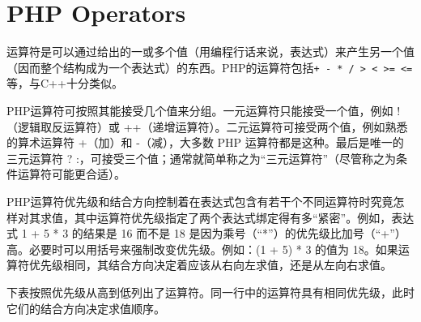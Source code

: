 \chapter{PHP Operators}


运算符是可以通过给出的一或多个值（用编程行话来说，表达式）来产生另一个值（因而整个结构成为一个表达式）的东西。PHP的运算符包括\verb|+ - * / > < >= <=|等，与C++十分类似。

PHP运算符可按照其能接受几个值来分组。一元运算符只能接受一个值，例如 !（逻辑取反运算符）或 +\/+（递增运算符）。二元运算符可接受两个值，例如熟悉的算术运算符 +（加）和 -（减），大多数 PHP 运算符都是这种。最后是唯一的三元运算符 ? :，可接受三个值；通常就简单称之为“三元运算符”（尽管称之为条件运算符可能更合适）。


PHP运算符优先级和结合方向控制着在表达式包含有若干个不同运算符时究竟怎样对其求值，其中运算符优先级指定了两个表达式绑定得有多“紧密”。例如，表达式 1 + 5 * 3 的结果是 16 而不是 18 是因为乘号（“*”）的优先级比加号（“+”）高。必要时可以用括号来强制改变优先级。例如：(1 + 5) * 3 的值为 18。如果运算符优先级相同，其结合方向决定着应该从右向左求值，还是从左向右求值。


下表按照优先级从高到低列出了运算符。同一行中的运算符具有相同优先级，此时它们的结合方向决定求值顺序。

